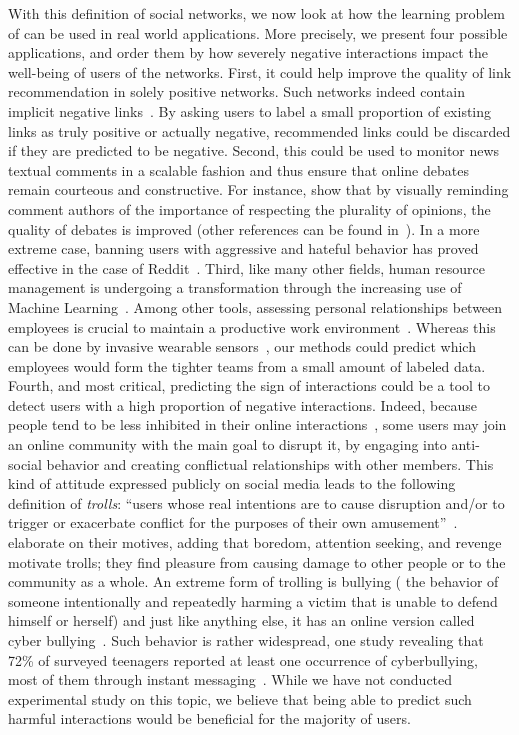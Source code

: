 \bigskip

With this definition of social networks, we now look at how the learning problem of \esp{} can be
used in real world applications. More precisely, we present four possible applications, and order
them by how severely negative interactions impact the well-being of users of the networks.
First, it could help improve the quality of link recommendation in solely positive networks. Such
networks indeed contain implicit negative links~\autocite{Yang2012}. By asking users to label a
small proportion of existing links as truly positive or actually negative, recommended links could
be discarded if they are predicted to be negative.
%
Second, this could be used to monitor news textual comments in a scalable fashion and thus ensure
that online debates remain courteous and constructive. For instance, \textcite{betterDebate14} show
that by visually reminding comment authors of the importance of respecting the plurality of
opinions, the quality of debates is improved (other references can be found
in~\autocite{journalism15}). In a more extreme case, banning users with aggressive and hateful
behavior has proved effective in the case of Reddit~\autocite{RedditBan15}.
%
Third, like many other fields, human resource management is undergoing a transformation through the
increasing use of Machine Learning~\autocite{MLinHR16}. Among other tools, assessing personal
relationships between employees is crucial to maintain a productive work
environment~\autocite{friendshipTeam02}. Whereas this
can be done by invasive wearable sensors~\autocite{WearableBehavior09}, our methods could predict
which employees would form the tighter teams from a small amount of labeled data.
%
Fourth, and most critical, predicting the sign of interactions could be a tool to detect users with
a high proportion of negative interactions. Indeed, because people tend to be less inhibited in
their online interactions~\cite{Suler04}, some users may join an online community with the main goal
to disrupt it, by engaging into anti-social behavior and creating conflictual relationships with
other members. This kind of attitude expressed publicly on social media leads to the following
definition of \emph{trolls}: \enquote{users whose real intentions are to cause disruption and/or to
trigger or exacerbate conflict for the purposes of their own amusement}~\autocite{Hardaker10}.
\Textcite{Shachaf10} elaborate on their motives, adding that boredom, attention seeking, and
revenge motivate trolls; they find pleasure from causing damage to other people or to the community
as a whole. An extreme form of trolling is bullying (\ie{} the behavior of someone intentionally and
repeatedly harming a victim that is unable to defend himself or herself) and just like anything
else, it has an online version called cyber bullying~\autocite{cyberbullying13}. Such behavior is
rather widespread, one study revealing that 72\% of  surveyed teenagers reported at least
one occurrence of cyberbullying, most of them through instant messaging~\autocite{Juvonen08}. While
we have not conducted experimental study on this topic, we believe that being able to predict such
harmful interactions would be beneficial for the majority of users.

